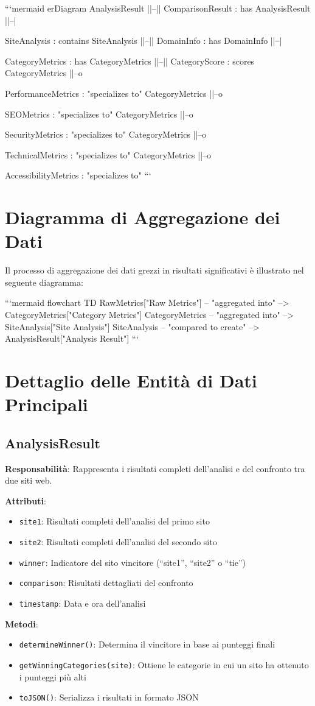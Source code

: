 ```mermaid
erDiagram
    AnalysisResult ||--|| ComparisonResult : has
    AnalysisResult ||--|{ SiteAnalysis : contains
    SiteAnalysis ||--|| DomainInfo : has
    DomainInfo ||--|{ CategoryMetrics : has
    CategoryMetrics ||--|| CategoryScore : scores
    CategoryMetrics ||--o{ PerformanceMetrics : "specializes to"
    CategoryMetrics ||--o{ SEOMetrics : "specializes to"
    CategoryMetrics ||--o{ SecurityMetrics : "specializes to"
    CategoryMetrics ||--o{ TechnicalMetrics : "specializes to"
    CategoryMetrics ||--o{ AccessibilityMetrics : "specializes to"
```

\section{Diagramma di Aggregazione dei Dati}
Il processo di aggregazione dei dati grezzi in risultati significativi è illustrato nel seguente diagramma:

```mermaid
flowchart TD
    RawMetrics["Raw Metrics"] -- "aggregated into" --> CategoryMetrics["Category Metrics"]
    CategoryMetrics -- "aggregated into" --> SiteAnalysis["Site Analysis"]
    SiteAnalysis -- "compared to create" --> AnalysisResult["Analysis Result"]
```

\section{Dettaglio delle Entità di Dati Principali}

\subsection{AnalysisResult}
\textbf{Responsabilità}: Rappresenta i risultati completi dell'analisi e del confronto tra due siti web.

\textbf{Attributi}:
\begin{itemize}
    \item \texttt{site1}: Risultati completi dell'analisi del primo sito
    \item \texttt{site2}: Risultati completi dell'analisi del secondo sito
    \item \texttt{winner}: Indicatore del sito vincitore (``site1'', ``site2'' o ``tie'')
    \item \texttt{comparison}: Risultati dettagliati del confronto
    \item \texttt{timestamp}: Data e ora dell'analisi
\end{itemize}

\textbf{Metodi}:
\begin{itemize}
    \item \texttt{determineWinner()}: Determina il vincitore in base ai punteggi finali
    \item \texttt{getWinningCategories(site)}: Ottiene le categorie in cui un sito ha ottenuto i punteggi più alti
    \item \texttt{toJSON()}: Serializza i risultati in formato JSON
\end{itemize}

}}}}}}}
